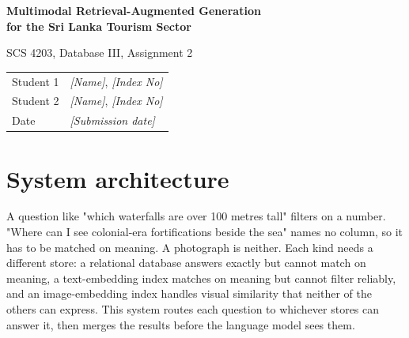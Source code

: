 \documentclass[11pt,a4paper]{article}
\begin{document}
\begin{center}
  {\Large\bfseries Multimodal Retrieval-Augmented Generation\\[0.15em]
   for the Sri Lanka Tourism Sector\par}
  \vspace{0.7em}
  {\normalsize SCS 4203, Database III, Assignment 2\par}
  \vspace{1em}
  \begin{tabular}{@{}ll@{}}
    \toprule
    Student 1 & \textit{[Name]}, \textit{[Index No]} \\
    Student 2 & \textit{[Name]}, \textit{[Index No]} \\
    Date      & \textit{[Submission date]} \\
    \bottomrule
  \end{tabular}
\end{center}

\vspace{0.8em}

\section{System architecture}

A question like "which waterfalls are over 100 metres tall" filters on a
number. "Where can I see colonial-era fortifications beside the sea" names no
column, so it has to be matched on meaning. A photograph is neither. Each kind
needs a different store: a relational database answers exactly but cannot
match on meaning, a text-embedding index matches on meaning but cannot filter
reliably, and an image-embedding index handles visual similarity that neither
of the others can express. This system routes each question to whichever
stores can answer it, then merges the results before the language model sees
them.
\end{document}
